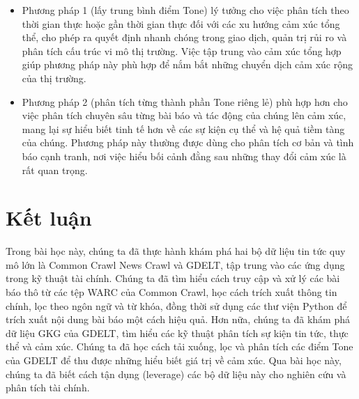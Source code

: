 \begin{itemize}
\item
  Phương pháp 1 (lấy trung bình điểm Tone) lý tưởng cho việc phân tích theo thời gian thực hoặc gần thời gian thực đối với các xu hướng cảm xúc tổng thể, cho phép ra quyết định nhanh chóng trong giao dịch, quản trị rủi ro và phân tích cấu trúc vi mô thị trường. Việc tập trung vào cảm xúc tổng hợp giúp phương pháp này phù hợp để nắm bắt những chuyển dịch cảm xúc rộng của thị trường.
\item
  Phương pháp 2 (phân tích từng thành phần Tone riêng lẻ) phù hợp hơn cho việc phân tích chuyên sâu từng bài báo và tác động của chúng lên cảm xúc, mang lại sự hiểu biết tinh tế hơn về các sự kiện cụ thể và hệ quả tiềm tàng của chúng. Phương pháp này thường được dùng cho phân tích cơ bản và tình báo cạnh tranh, nơi việc hiểu bối cảnh đằng sau những thay đổi cảm xúc là rất quan trọng.
\end{itemize}

\section{Kết luận}

Trong bài học này, chúng ta đã thực hành khám phá hai bộ dữ liệu tin tức quy mô lớn là Common Crawl News Crawl và GDELT, tập trung vào các ứng dụng trong kỹ thuật tài chính. Chúng ta đã tìm hiểu cách truy cập và xử lý các bài báo thô từ các tệp WARC của Common Crawl, học cách trích xuất thông tin chính, lọc theo ngôn ngữ và từ khóa, đồng thời sử dụng các thư viện Python để trích xuất nội dung bài báo một cách hiệu quả. Hơn nữa, chúng ta đã khám phá dữ liệu GKG của GDELT, tìm hiểu các kỹ thuật phân tích sự kiện tin tức, thực thể và cảm xúc. Chúng ta đã học cách tải xuống, lọc và phân tích các điểm Tone của GDELT để thu được những hiểu biết giá trị về cảm xúc. Qua bài học này, chúng ta đã biết cách tận dụng (leverage) các bộ dữ liệu này cho nghiên cứu và phân tích tài chính.
